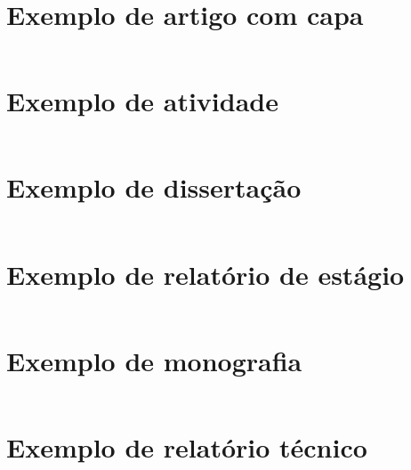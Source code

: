 \documentclass[artigo]{iftex2024}
\begin{document}
\newpage
\section{Exemplo de artigo com capa} \label{ap:exemplo_artigo_capa}

\inputminted[linenos]{latex}{exemplo_artigo_capa.tex}

\newpage
\section{Exemplo de atividade} \label{ap:exemplo_atividade}

\inputminted[linenos]{latex}{exemplo_atividade.tex}

\newpage
\section{Exemplo de dissertação} \label{ap:exemplo_dissertacao}

\inputminted[linenos]{latex}{exemplo_dissertacao.tex}

\newpage
\section{Exemplo de relatório de estágio} \label{ap:exemplo_estagio}

\inputminted[linenos]{latex}{exemplo_relatorio_estagio.tex}

\newpage
\section{Exemplo de monografia} \label{ap:exemplo_monografia}

\inputminted[linenos]{latex}{exemplo_monografia.tex}

\newpage
\section{Exemplo de relatório técnico} \label{ap:exemplo_relatorio_tecnico}

\inputminted[linenos]{latex}{exemplo_relatorio_tecnico.tex}
\end{document}
